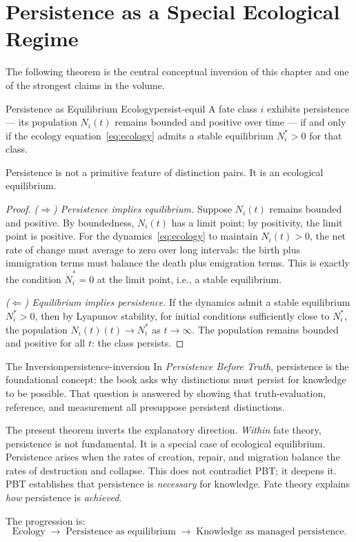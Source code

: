 \documentclass[12pt,twoside,openright]{book}
\newcommand{\fatePop}[1]{N_{#1}(t)}
\providecommand{\fatePop}[1]{N_{#1}(t)}
\begin{document}
\section{Persistence as a Special Ecological Regime}

The following theorem is the central conceptual inversion of
this chapter and one of the strongest claims in the volume.

\begin{theorem}{Persistence as Equilibrium Ecology}{persist-equil}
A fate class $i$ exhibits persistence --- its population
$\fatePop{i}$ remains bounded and positive over time ---
if and only if the ecology equation~\eqref{eq:ecology}
admits a stable equilibrium $N_i^*>0$ for that class.

Persistence is not a primitive feature of distinction pairs.
It is an ecological equilibrium.
\begin{proof}
\emph{($\Rightarrow$) Persistence implies equilibrium.}
Suppose $\fatePop{i}$ remains bounded and positive. By
boundedness, $\fatePop{i}$ has a limit point; by positivity,
the limit point is positive. For the dynamics~\eqref{eq:ecology}
to maintain $\fatePop{i}>0$, the net rate of change must
average to zero over long intervals: the birth plus immigration
terms must balance the death plus emigration terms. This is
exactly the condition $\dot{N}_i^*=0$ at the limit point,
i.e., a stable equilibrium.

\emph{($\Leftarrow$) Equilibrium implies persistence.}
If the dynamics admit a stable equilibrium $N_i^*>0$, then by
Lyapunov stability, for initial conditions sufficiently close
to $N_i^*$, the population $\fatePop{i}(t)\to N_i^*$ as
$t\to\infty$. The population remains bounded and positive for
all $t$: the class persists.
\end{proof}
\end{theorem}

\begin{remark}{The Inversion}{persistence-inversion}
In \textit{Persistence Before Truth}, persistence is the
foundational concept: the book asks why distinctions must
persist for knowledge to be possible. That question is
answered by showing that truth-evaluation, reference, and
measurement all presuppose persistent distinctions.

The present theorem inverts the explanatory direction.
\emph{Within} fate theory, persistence is not fundamental.
It is a special case of ecological equilibrium. Persistence
arises when the rates of creation, repair, and migration
balance the rates of destruction and collapse. This does not
contradict PBT; it deepens it. PBT establishes that persistence
is \emph{necessary} for knowledge. Fate theory explains
\emph{how} persistence is \emph{achieved}.

The progression is:
\[
  \text{Ecology}
  \;\longrightarrow\;
  \text{Persistence as equilibrium}
  \;\longrightarrow\;
  \text{Knowledge as managed persistence.}
\]
\end{remark}
\end{document}
